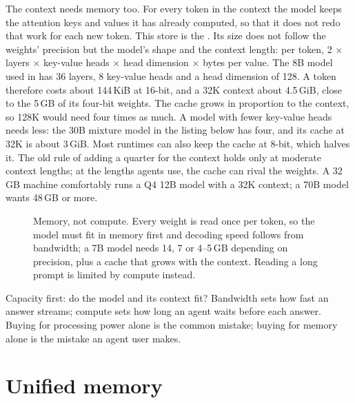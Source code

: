 The context needs memory too. For every token in the context the model keeps
the attention keys and values it has already computed, so that it does not
redo that work for each new token. This store is the . Its size
does not follow the weights' precision but the model's shape and the context
length: per token, 2 $\times$ layers $\times$ key-value heads $\times$ head
dimension $\times$ bytes per value. The 8B model used in  has
36 layers, 8 key-value heads and a head dimension of 128. A token therefore
costs about 144\,KiB at 16-bit, and a 32K context about 4.5\,GiB, close to
the 5\,GB of its four-bit weights. The cache grows in proportion to the context,
so 128K would need four times as much. A model with fewer key-value heads
needs less: the 30B mixture model in the listing below has four, and its cache
at 32K is about 3\,GiB. Most runtimes can also keep the cache at 8-bit, which
halves it. The old rule of adding a quarter for the context holds only at
moderate context lengths; at the lengths agents use, the cache can rival the
weights. A 32\,GB machine comfortably runs a Q4 12B model with a 32K context; a
70B model wants 48\,GB or more.

\begin{figure}[htbp]
\centering
{}
\caption{Memory, not compute. Every weight is read once per token, so the model
must fit in memory first and decoding speed follows from bandwidth; a 7B model
needs 14, 7 or 4--5\,GB depending on precision, plus a cache that grows with
the context. Reading a long prompt is limited by compute instead.}
\label{fig:memory}
\end{figure}

\begin{keypoint}
Capacity first: do the model and its context fit? Bandwidth sets how fast an
answer streams; compute sets how long an agent waits before each answer. Buying
for processing power alone is the common mistake; buying for memory alone is
the mistake an agent user makes.
\end{keypoint}

\section{Unified memory}

